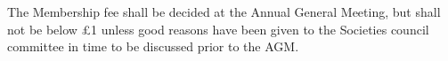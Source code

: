 \begin{clause}  
  The Membership fee shall be decided at the Annual General Meeting, but shall not be below \pounds 1 unless good reasons have been given to the Societies council committee in time to be discussed prior to the AGM.
\end{clause}
